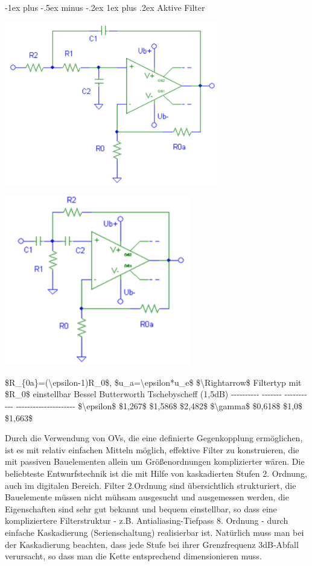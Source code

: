\documentclass[a4paper]{article}
\makeatletter
\renewcommand{\subsubsection}{\@startsection{subsubsection}{3}{0mm}%
 {-1ex plus -.5ex minus -.2ex}%
 {1ex plus .2ex}%
 {\normalfont\small\bfseries}}
\makeatother
\begin{document}
\begin{multicols}{3}
  \subsubsection{Aktive Filter}\label{aktive-filter}

  \begin{itemize*}
    \item \includegraphics[width=.5\linewidth]{Assets/Biosignalverarbeitung-tiefpass-2.ordnung.png}
    \item \includegraphics[width=.5\linewidth]{Assets/Biosignalverarbeitung-hochpass-2.ordnung.png}
    \item \$R\_\{0a\}=(\textbackslash epsilon-1)R\_0\$, \$u\_a=\textbackslash epsilon*u\_e\$ \$\textbackslash Rightarrow\$ Filtertyp mit \$R\_0\$ einstellbar \textbar{} \textbar{} Bessel \textbar{} Butterworth \textbar{} Tschebyscheff (1,5dB) \textbar{} \textbar{} -\/-\/-\/-\/-\/-\/-\/-\/-\/- \textbar{} -\/-\/-\/-\/-\/-\/- \textbar{} -\/-\/-\/-\/-\/-\/-\/-\/-\/-\/- \textbar{} -\/-\/-\/-\/-\/-\/-\/-\/-\/-\/-\/-\/-\/-\/-\/-\/-\/-\/-\/-\/- \textbar{} \textbar{} \$\textbackslash epsilon\$ \textbar{} \$1,267\$ \textbar{} \$1,586\$ \textbar{} \$2,482\$ \textbar{} \textbar{} \$\textbackslash gamma\$ \textbar{} \$0,618\$ \textbar{} \$1,0\$ \textbar{} \$1,663\$ \textbar{}
    \item Durch die Verwendung von OVs, die eine definierte Gegenkopplung ermöglichen, ist es mit relativ einfachen Mitteln möglich, effektive Filter zu konstruieren, die mit passiven Bauelementen allein um Größenordnungen komplizierter wären. Die beliebteste Entwurfstechnik ist die mit Hilfe von kaskadierten Stufen 2. Ordnung, auch im digitalen Bereich. Filter 2.Ordnung sind übersichtlich strukturiert, die Bauelemente müssen nicht mühsam ausgesucht und ausgemessen werden, die Eigenschaften sind sehr gut bekannt und bequem einstellbar, so dass eine kompliziertere Filterstruktur - z.B. Antialiasing-Tiefpass 8. Ordnung - durch einfache Kaskadierung (Serienschaltung) realisierbar ist. Natürlich muss man bei der Kaskadierung beachten, dass jede Stufe bei ihrer Grenzfrequenz 3dB-Abfall verursacht, so dass man die Kette entsprechend dimensionieren muss.

\end{itemize*}
\end{multicols}
\end{document}
